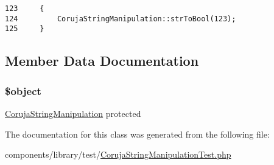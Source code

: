 \begin{Code}\begin{verbatim}123     {
124         CorujaStringManipulation::strToBool(123);
125     }
\end{verbatim}
\end{Code}




\subsection{Member Data Documentation}
\hypertarget{class_coruja_string_manipulation_test_52123b83a1952a68c5513e47d59ec4a6}{
\subsubsection[{\$object}]{\setlength{\rightskip}{0pt plus 5cm}\$object}}
\label{class_coruja_string_manipulation_test_52123b83a1952a68c5513e47d59ec4a6}


\hyperlink{class_coruja_string_manipulation}{CorujaStringManipulation}  protected 

The documentation for this class was generated from the following file:\begin{CompactItemize}
\item 
components/library/test/\hyperlink{_coruja_string_manipulation_test_8php}{CorujaStringManipulationTest.php}\end{CompactItemize}
